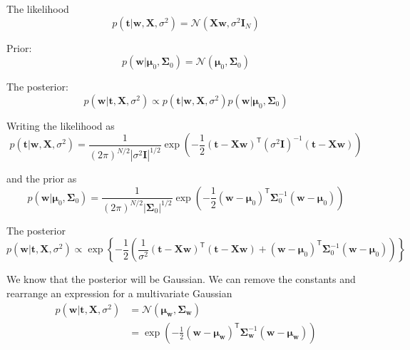 \documentclass[a4paper,11pt]{article} %
\begin{document}
The likelihood
\begin{equation}
p(\mathbf{t} | \mathbf{w}, \mathbf{X}, \sigma^2 ) =
\mathcal{N}( \mathbf{Xw}, \sigma^2\mathbf{I}_{N} )
\end{equation}

Prior:
\begin{equation}
p(\mathbf{w} | \boldsymbol{\mu}_{0}, \boldsymbol{\Sigma}_{0}) = 
\mathcal{N}(\boldsymbol{\mu}_{0}, \boldsymbol{\Sigma}_{0})
\end{equation}

The posterior:
\begin{equation}
p(\mathbf{w} | \mathbf{t}, \mathbf{X}, \sigma^2) \propto
p(\mathbf{t} | \mathbf{w}, \mathbf{X}, \sigma^2)
p(\mathbf{w} | \boldsymbol{\mu}_{0}, \boldsymbol{\Sigma}_{0})
\end{equation}

Writing the likelihood as
\begin{equation}
p(\mathbf{t} | \mathbf{w}, \mathbf{X}, \sigma^2) = 
\frac{1}{(2\pi)^{N/2} \left|\sigma^2\mathbf{I}\right|^{1/2}}
\exp\left(
-\frac{1}{2}(\mathbf{t} - \mathbf{Xw})^{\mathsf{T}}
(\sigma^2\mathbf{I})^{-1}
(\mathbf{t} - \mathbf{Xw})
\right)
\end{equation}

and the prior as
\begin{equation}
p(\mathbf{w} | \boldsymbol{\mu}_{0}, \boldsymbol{\Sigma}_{0}) =
\frac{1}{(2\pi)^{N/2} \left|\boldsymbol{\Sigma}_{0}\right|^{1/2}}
\exp\left(
-\frac{1}{2}(\mathbf{w} - \boldsymbol{\mu}_{0})^{\mathsf{T}}
\boldsymbol{\Sigma}_{0}^{-1}
(\mathbf{w} - \boldsymbol{\mu}_{0})
\right)
\end{equation}

The posterior
\begin{equation}
p(\mathbf{w} | \mathbf{t}, \mathbf{X}, \sigma^2) \propto
\exp\left\{
-\frac{1}{2} \left(
\frac{1}{\sigma^2}(\mathbf{t} - \mathbf{Xw})^{\mathsf{T}}
(\mathbf{t} - \mathbf{Xw}) +
(\mathbf{w} - \boldsymbol{\mu}_{0})^{\mathsf{T}}
\boldsymbol{\Sigma}_{0}^{-1}
(\mathbf{w} - \boldsymbol{\mu}_{0})
\right)
\right\}
\end{equation}

We know that the posterior will be Gaussian. We can remove the constants
and rearrange an expression for a multivariate Gaussian
\begin{align}
p(\mathbf{w} | \mathbf{t}, \mathbf{X}, \sigma^2) & =
\mathcal{N}(\boldsymbol{\mu}_{\mathbf{w}},\boldsymbol{\Sigma}_{\mathbf{w}}) \\
& = \exp\left(
-\frac{1}{2}(\mathbf{w} - \boldsymbol{\mu}_{\mathbf{w}})^{\mathsf{T}}
\boldsymbol{\Sigma}^{-1}_{\mathbf{w}}
(\mathbf{w} - \boldsymbol{\mu}_{\mathbf{w}})
\right)
\end{align}
\end{document}
